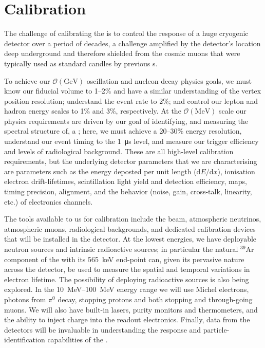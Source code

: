 \section{Calibration}
\label{sec:fdsp-exec-calibration}

The challenge of calibrating the   is to control the response of a huge cryogenic detector over a period of decades, a challenge amplified by the detector's location deep underground and therefore shielded from the cosmic muons that were typically used as standard candles by previous s.

To achieve our $\mathcal{O}(\si{\giga\electronvolt})$ oscillation and nucleon decay physics goals, we must know our fiducial volume to 1--2\% and have a similar understanding of the vertex position resolution; understand the \nue event rate to 2\%; and control our lepton and hadron energy scales to 1\% and 3\%, respectively. At the $\mathcal{O}(\si{\mega\electronvolt})$ scale our physics requirements are driven by our goal of identifying, and measuring the spectral structure of, a ; here, we must achieve a 20--30\% energy resolution, understand our event timing to the \SI{1}{\micro\second} level, and measure our trigger efficiency and levels of radiological background. These are all high-level calibration requirements, but the underlying detector parameters that we are characterising are parameters such as the energy deposted per unit length ($\mathrm{d}E/\mathrm{d}x$), ionisation electron drift-lifetimes, scintillation light yield and detection efficiency, \efield maps, timing precision,  alignment, and the behavior (noise, gain, cross-talk, linearity, etc.) of electronics channels.

The tools available to us for calibration include the  beam, atmospheric neutrinos, atmospheric muons, radiological backgrounds, and dedicated calibration devices that will be installed in the detector. At the lowest energies, we have deployable neutron sources and intrinsic radioactive sources; in particular the natural $^{39}$Ar component of the  with its \SI{565}{\kilo\electronvolt} end-point can, given its pervasive nature across the detector, be used to measure the spatial and temporal variations in electron lifetime. The possibility of deploying radioactive sources is also being explored. In the \SIrange{10}{100}{\mega\electronvolt} energy range we will use Michel electrons, photons from $\pi^{0}$ decay, stopping protons and both stopping and through-going muons. We will also have built-in lasers, purity monitors and thermometers, and the ability to inject charge into the readout electronics. Finally, data from the  detectors will be invaluable in understanding the response and particle-identification capabilities of the .

